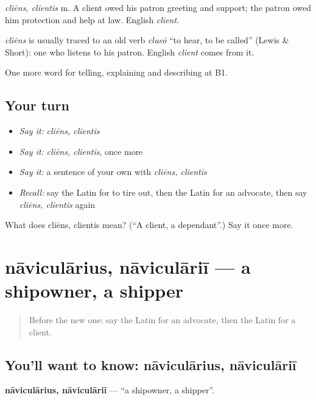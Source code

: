 \emph{cliēns, clientis} m. A client owed his patron greeting and support; the patron owed him protection and help at law. English \emph{client}.

\begin{cousinweb}
\emph{cliēns} is usually traced to an old verb \emph{clueō} \textquotedblleft{}to hear, to be called\textquotedblright{} (Lewis \& Short): one who listens to his patron. English \emph{client} comes from it.
\end{cousinweb}

\begin{grammarlens}[title={What you've built}]
One more word for telling, explaining and describing at B1.
\end{grammarlens}

\subsection*{Your turn}
\begin{itemize}
\raggedright
  \item \emph{Say it:} \emph{cliēns, clientis}
  \item \emph{Say it:} \emph{cliēns, clientis}, once more
  \item \emph{Say it:} a sentence of your own with \emph{cliēns, clientis}
  \item \emph{Recall:} say the Latin for to tire out, then the Latin for an advocate, then say \emph{cliēns, clientis} again
\end{itemize}

\begin{tcolorbox}[breakable,colback=teal!4,colframe=teal!35!black,title={Before you move on}]
What does cliēns, clientis mean? (\textquotedblleft{}A client, a dependant\textquotedblright{}.) Say it once more.
\end{tcolorbox}
\section[nāviculārius, nāviculāriī]{nāviculārius, nāviculāriī — a shipowner, a shipper}

\label{lesson:LA-C381-navicularius}



\begin{quote}
Before the new one: say the Latin for an advocate, then the Latin for a client.
\end{quote}

\subsection*{You'll want to know: nāviculārius, nāviculāriī}
\textbf{nāviculārius, nāviculāriī} — \textquotedblleft{}a shipowner, a shipper\textquotedblright{}.

